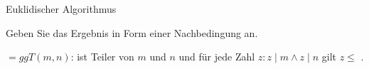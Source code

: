 \addtocounter{exercise}{-1}\addtocounter{solve}{-1}%
\begin{frame}[fragile]{Euklidischer Algorithmus}
    \begin{exercise}[c)]
        Geben Sie das Ergebnis in Form einer Nachbedingung an.
    \end{exercise}
    \pause[]
    \begin{solve}[b)]
         $=ggT(m,n)$:  ist Teiler von $m$ und $n$ und für jede Zahl $z:z\mid m\wedge z\mid n$ gilt $z\leq$ .
    \end{solve}
\end{frame}